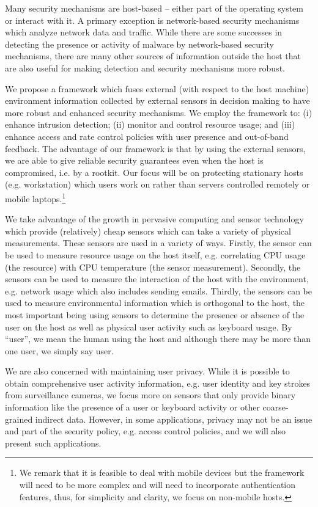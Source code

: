 Many security mechanisms are host-based -- either
part of the operating system or interact with it.
A primary exception is network-based security mechanisms which
analyze network data and traffic.
While there are some successes in detecting the presence or activity of
malware by network-based security mechanisms, there are many other
sources of information outside the host that are also useful for
making detection and security mechanisms more robust.

We propose a framework which
fuses external (with respect to the host machine)
environment information collected by external sensors
in decision making to have more robust and enhanced
security mechanisms.
We employ the framework to:
(i) enhance intrusion detection;
(ii) monitor and control resource usage;
and (iii) enhance access and rate control policies with
user presence and out-of-band feedback.
The advantage of our framework is that by using the external sensors,
we are able to give reliable security guarantees even when the host is
compromised, i.e. by a rootkit.
Our focus will be on protecting stationary hosts (e.g.
workstation) which users work on rather than servers controlled remotely
or mobile laptops.\footnote{
We remark that it is feasible to deal with mobile devices but the framework
will need to be more complex and will need to incorporate authentication
features, thus, for simplicity and clarity, we focus on non-mobile hosts.
}

We take advantage of the growth in pervasive computing and sensor technology
which provide (relatively) cheap sensors which can take a variety of physical
measurements.
These sensors are used in a variety of ways.
Firstly, the sensor can be used to measure resource usage on the host itself,
e.g. correlating CPU usage (the resource)
with CPU temperature (the sensor measurement).
Secondly, the sensors can be used to measure the interaction of the host
with the environment, e.g. network usage which also includes sending emails.
Thirdly, the sensors can be used to measure environmental information
which is orthogonal to the host, the most important being
using sensors to determine the presence or absence of
the user on the host as well as physical user activity such as keyboard usage.
By ``user'', we mean the human using the host and although
there may be more than one user, we simply say user.

We are also concerned with maintaining user privacy.
While it is possible to obtain comprehensive user activity information,
e.g. user identity and key strokes from
surveillance cameras, 
we focus more on sensors that only provide
binary information like the presence of a user or keyboard activity
or other coarse-grained indirect data.
However, in some applications, privacy may not be an issue and part of
the security policy, e.g. access control policies, and we will also
present such applications.

